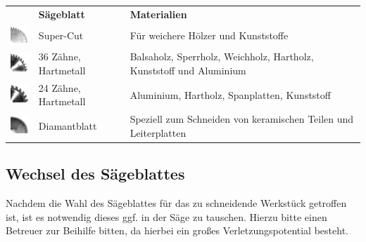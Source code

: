 \documentclass{\basedir/fablab-document}
\begin{document}
\begin{table}[h]
	\centering
	\begin{tabular}{lll}
		&\textbf{Sägeblatt}  & \textbf{Materialien} \\
		\includegraphics[width=1cm]{bilder/super_cut.png}&Super-Cut & Für weichere Hölzer und Kunststoffe \\
		\includegraphics[width=1cm]{bilder/36zahne.png}&36 Zähne, Hartmetall &  Balsaholz, Sperrholz, Weichholz, Hartholz, Kunststoff und Aluminium\\
		\includegraphics[width=1cm]{bilder/24zahne.png}&24 Zähne, Hartmetall & Aluminium, Hartholz, Spanplatten, Kunststoff \\
		\includegraphics[width=1cm]{bilder/diamant.png}&Diamantblatt & Speziell zum Schneiden von keramischen Teilen und Leiterplatten
	\end{tabular}
\end{table}

\subsection{Wechsel des Sägeblattes}

Nachdem die Wahl des Sägeblattes für das zu schneidende Werkstück getroffen ist, ist es notwendig dieses ggf. in der Säge zu tauschen. Hierzu bitte einen Betreuer zur Beihilfe bitten, da hierbei ein großes Verletzungspotential besteht. 
\end{document}
